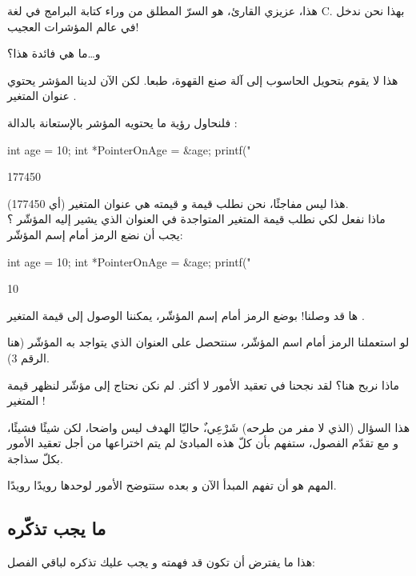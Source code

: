 هذا، عزيزي القارئ، هو السرّ المطلق من وراء كتابة البرامج في لغة \textenglish{C}.
بهذا نحن ندخل في عالم المؤشرات العجيب!
\begin{question}
	و\dots ما هي فائدة هذا؟
\end{question}
هذا لا يقوم بتحويل الحاسوب إلى آلة صنع القهوة، طبعا. لكن الآن لدينا المؤشر
يحتوي عنوان المتغير
.

فلنحاول رؤية ما يحتويه المؤشر بالإستعانة بالدالة
:
\begin{Csource}
int age = 10;
int *PointerOnAge = &age;
printf("%
\end{Csource}
\begin{Console}
177450
\end{Console}
هذا ليس مفاجئًا، نحن نطلب قيمة
و قيمته هي عنوان المتغير
(أي 177450).\\
ماذا نفعل لكي نطلب قيمة المتغير المتواجدة في العنوان الذي يشير إليه المؤشّر
؟ يجب أن نضع الرمز
\InlineCode{*}
أمام إسم المؤشّر:
\begin{Csource}
int age = 10;
int *PointerOnAge = &age;
printf("%
\end{Csource}
\begin{Console}
10
\end{Console}
ها قد وصلنا! بوضع الرمز
\InlineCode{*}
أمام إسم المؤشّر، يمكننا الوصول إلى قيمة المتغير
.

لو استعملنا الرمز
\InlineCode{\&}
أمام اسم المؤشّر، سنتحصل على العنوان الذي يتواجد به المؤشّر (هنا الرقم 3).

\begin{question}
	ماذا نربح هنا؟ لقد نجحنا في تعقيد الأمور لا أكثر. لم نكن نحتاج إلى مؤشّر لنظهر قيمة المتغير
!
\end{question}

هذا السؤال (الذي لا مفر من طرحه) شَرْعِي،ٌ حاليّا الهدف ليس واضحا، لكن شيئًا فشيئًا، و مع تقدّم الفصول، ستفهم بأن كلّ هذه المبادئ لم يتم اختراعها من أجل تعقيد الأمور بكلّ سذاجة.

المهم هو أن تفهم المبدأ الآن و بعده ستتوضح الأمور لوحدها رويدًا رويدًا.

\subsection{ما يجب تذكّره}

هذا ما يفترض أن تكون قد فهمته و يجب عليك تذكره لباقي الفصل:

